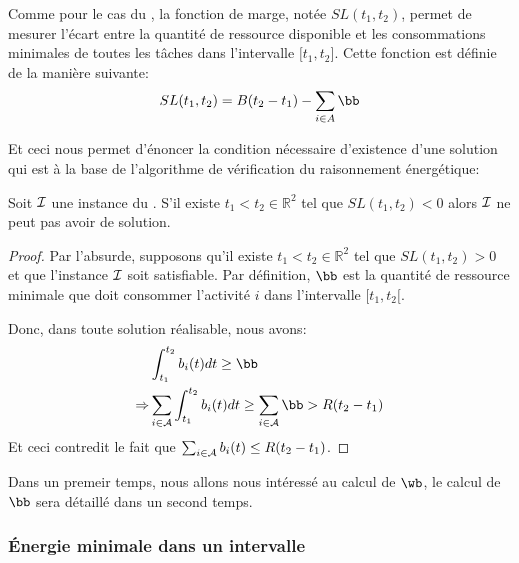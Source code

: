 Comme pour le cas du \CUSP, la fonction de marge, notée $SL(t_1,t_2)$,
permet de mesurer l'écart entre la quantité de ressource disponible et
les consommations minimales de toutes les tâches dans l'intervalle
${[}t_1,t_2{]}$. Cette fonction est définie de la manière suivante:
\[ SL(t_1,t_2)=B(t_2-t_1)-\sum\limits_{i \in A} \bb \]

Et ceci nous permet d'énoncer la condition nécessaire d'existence
d'une solution qui est à la base de l'algorithme de vérification du
raisonnement énergétique:

\begin{theo}
  Soit ${\cal I}$ une instance du \CECSP. S'il existe $t_1 < t_2 \in
  \mathbb{R}^2$ tel que $SL(t_1,t_2) <0$ alors ${\cal I}$ ne peut pas avoir
  de solution.
\end{theo}

\begin{proof}
Par l'absurde, supposons qu'il existe $t_1 < t_2 \in \mathbb{R}^2$ tel
que $SL(t_1,t_2) > 0$ et que l'instance ${\cal I}$ soit satisfiable. Par
définition, $\bb$ est la quantité de ressource minimale que doit
consommer l'activité $i$ dans l'intervalle $[t_1,t_2{[}$. 

Donc, dans toute solution réalisable, nous avons: 
\begin{align*}
 & \int_{t_1}^{t_2} b_i(t)dt \ge \bb\\
\Rightarrow  & \sum_{i \in \A} \int_{t_1}^{t_2} b_i(t)dt \ge \sum_{i
               \in \A}  \bb > R(t_2-t_1)
\end{align*}
Et ceci contredit le fait que $\sum_{i \in {\cal A}} b_i(t) \le
R(t_2-t_1)$. 
\end{proof}


Dans un premeir temps, nous allons nous intéressé au calcul de $\wb$,
le calcul de $\bb$ sera détaillé dans un second temps. 


\subsubsection{{\'E}nergie minimale dans un intervalle}

